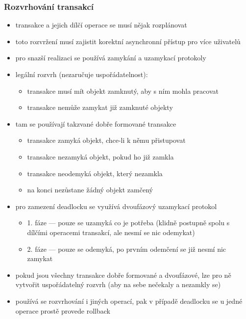 \subsubsection*{Rozvrhování transakcí}
\begin{itemize}
	\item transakce a jejich dílčí operace se musí nějak rozplánovat
	\item toto rozvržení musí zajistit korektní asynchronní přístup pro více uživatelů
	\item pro snazší realizaci se používá zamykání a uzamykací protokoly
	\item legální rozvrh (nezaručuje uspořádatelnost):
	\begin{itemize}
		\item transakce musí mít objekt zamknutý, aby s ním mohla pracovat
		\item transakce nemůže zamykat již zamknuté objekty
	\end{itemize}
	\item tam se používají takzvané dobře formované transakce
	\begin{itemize}
		\item transakce zamyká objekt, chce-li k němu přistupovat
		\item transakce nezamyká objekt, pokud ho již zamkla
		\item transakce neodemyká objekt, který nezamkla
		\item na konci nezůstane žádný objekt zamčený
	\end{itemize}
	\item pro zamezení deadlocku se využívá dvoufázový uzamykací protokol
	\begin{itemize}
		\item 1. fáze --- pouze se uzamyká co je potřeba (klidně postupně spolu s dílčími operacemi transakcí, ale nesmí se nic odemykat)
		\item 2. fáze --- pouze se odemyká, po prvním odemčení se již nesmí nic zamykat
	\end{itemize}
	\item pokud jsou všechny transakce dobře formované a dvoufázové, lze pro ně vytvořit uspořádatelný rozvrh (aby na sebe nečekaly a nezamkly se)
	\item používá se rozvrhování i jiných operací, pak v případě deadlocku se u jedné operace prostě provede rollback
\end{itemize}